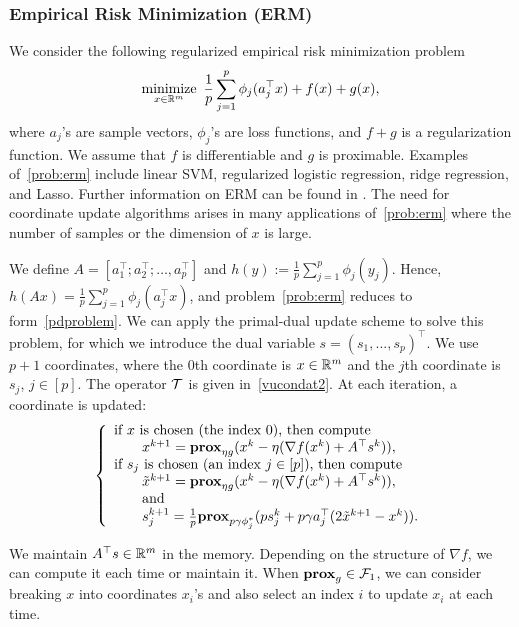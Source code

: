 \subsubsection{Empirical Risk Minimization (ERM)}
We consider the following regularized empirical risk minimization problem
\begin{equation}\label{prob:erm}
\Min_{x\in\RR^m}~ \frac{1}{p}\sum_{j=1}^p\phi_j(a_j^\top x)+f(x)+g(x),
\end{equation}
where $a_j$'s are sample vectors, $\phi_j$'s are loss functions, and $f+g$ is a regularization function. We assume that $f$ is differentiable and $g$ is proximable. Examples of~\eqref{prob:erm} include linear SVM, regularized logistic regression, ridge regression, and Lasso. Further information on ERM can be found in \cite{hastie2005elements}. The need for coordinate update algorithms arises in many applications of~\eqref{prob:erm} where the number of samples or the dimension of $x$ is large. 

We define $A=[a_1^\top;a_2^\top;\dots,a_p^\top]$ and $h(y):=\frac{1}{p}\sum_{j=1}^p\phi_j(y_j)$. Hence, $h(Ax)=\frac{1}{p}\sum_{j=1}^p\phi_j(a_j^\top x)$, and problem~\eqref{prob:erm} reduces to form~\eqref{pdproblem}.
We can apply the primal-dual update scheme to solve this problem, for which we introduce the dual variable $s = (s_1, ..., s_p)^\top$. We use $p+1$ coordinates, where the $0$th coordinate is $x\in\mathbb{R}^m$ and the $j$th coordinate is $s_j$, $j\in [p]$. The operator ${\mathcal{T}}$ is given in~\eqref{vucondat2}. At each iteration, a coordinate is updated:
\begin{equation}
{\left\{
\begin{array}{l}
\text{if }x\text{ is chosen (the index 0), then compute}\\
\qquad {x}^{k+1}=\prox_{\eta g}(x^k-\eta(\nabla f(x^k)+A^\top s^k)),\\
\text{if }s_j\text{ is chosen (an index $j \in [p]$), then compute}\\
\qquad\tilde{x}^{k+1}=\prox_{\eta g}(x^k-\eta(\nabla f(x^k)+A^\top s^k)),\\
\qquad\text{and}\\
\qquad{s}_j^{k+1}=\frac{1}{p}\prox_{p\gamma \phi_j^*} (ps_j^k+p\gamma a_j^\top(2\tilde{x}^{k+1}-x^k)).
\end{array}
\right.
}\end{equation}

We maintain $A^\top s\in \mathbb{R}^m$ in the memory. Depending on the structure of $\nabla f$, we can compute it each time or maintain it. When $\mathbf{prox}_g\in{\mathcal{F}}_1$, we can consider breaking $x$ into coordinates $x_i$'s and also select an index $i$ to update $x_i$ at each time.
